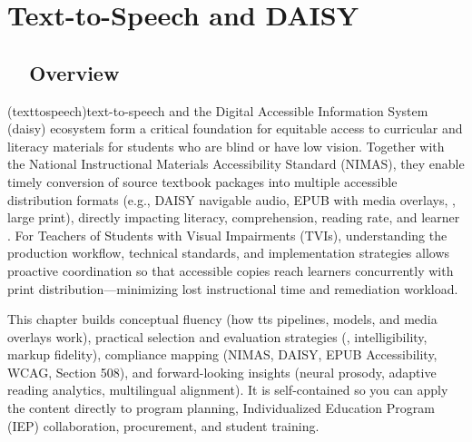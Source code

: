 \chapter{Text-to-Speech and DAISY}\label{ch7:chap:text-to-speech-daisy}
\raggedright


\section{~~Overview}\label{ch07:sec:overview}
 (\gls{texttospeech})text-to-speech and the Digital Accessible Information System
(\gls{daisy}) ecosystem form a critical foundation for equitable 
access to curricular and literacy materials for students who are blind or have low vision. Together with
the National Instructional Materials Accessibility Standard (NIMAS), they enable timely
conversion of source textbook packages into multiple accessible distribution formats (e.g., DAISY
navigable audio, EPUB with media overlays, , large print), directly impacting
literacy, comprehension, reading rate, and learner . For Teachers of Students with
Visual Impairments (TVIs), understanding the production workflow, technical standards, and implementation
strategies allows proactive coordination so that accessible copies reach learners concurrently with print
distribution—minimizing lost instructional time and remediation workload.

This chapter builds conceptual fluency (how \gls{tts} pipelines,  models, and media overlays work),
practical selection and evaluation strategies (, intelligibility, markup fidelity), compliance
mapping (NIMAS, DAISY, EPUB Accessibility, WCAG, Section 508), and forward-looking insights (neural
prosody, adaptive reading analytics, multilingual alignment). It is self-contained so you can apply the
content directly to program planning, Individualized Education Program (IEP) collaboration, procurement,
and student training.

